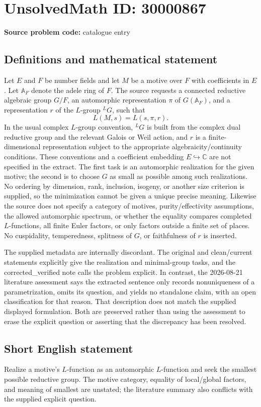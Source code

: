 \documentclass[11pt]{article}
\newcommand{\C}{\mathbb{C}}
\begin{document}
\section*{UnsolvedMath ID: 30000867}
\textbf{Source problem code:} catalogue entry
\subsection{Definitions and mathematical statement}
Let $E$ and $F$ be number fields and let $M$ be a motive over $F$ with coefficients in $E$. Let $\mathbb A_F$ denote the adele ring of $F$. The source requests a connected reductive algebraic group $G/F$, an automorphic representation $\pi$ of $G(\mathbb A_F)$, and a representation $r$ of the $L$-group ${}^LG$, such that \[L(M,s)=L(s,\pi,r).\] In the usual complex $L$-group convention, ${}^LG$ is built from the complex dual reductive group and the relevant Galois or Weil action, and $r$ is a finite-dimensional representation subject to the appropriate algebraicity/continuity conditions. These conventions and a coefficient embedding $E\hookrightarrow\C$ are not specified in the extract. The first task is an automorphic realization for the given motive; the second is to choose $G$ as small as possible among such realizations. No ordering by dimension, rank, inclusion, isogeny, or another size criterion is supplied, so the minimization cannot be given a unique precise meaning. Likewise the source does not specify a category of motives, purity/effectivity assumptions, the allowed automorphic spectrum, or whether the equality compares completed $L$-functions, all finite Euler factors, or only factors outside a finite set of places. No cuspidality, temperedness, splitness of $G$, or faithfulness of $r$ is inserted.\par The supplied metadata are internally discordant. The original and clean/current statements explicitly give the realization and minimal-group tasks, and the corrected\_verified note calls the problem explicit. In contrast, the 2026-08-21 literature assessment says the extracted sentence only records nonuniqueness of a parametrization, omits its question, and yields no standalone claim, with an open classification for that reason. That description does not match the supplied displayed formulation. Both are preserved rather than using the assessment to erase the explicit question or asserting that the discrepancy has been resolved.
\subsection{Short English statement}
Realize a motive's $L$-function as an automorphic $L$-function and seek the smallest possible reductive group. The motive category, equality of local/global factors, and meaning of smallest are unstated; the literature summary also conflicts with the supplied explicit question.
\end{document}
